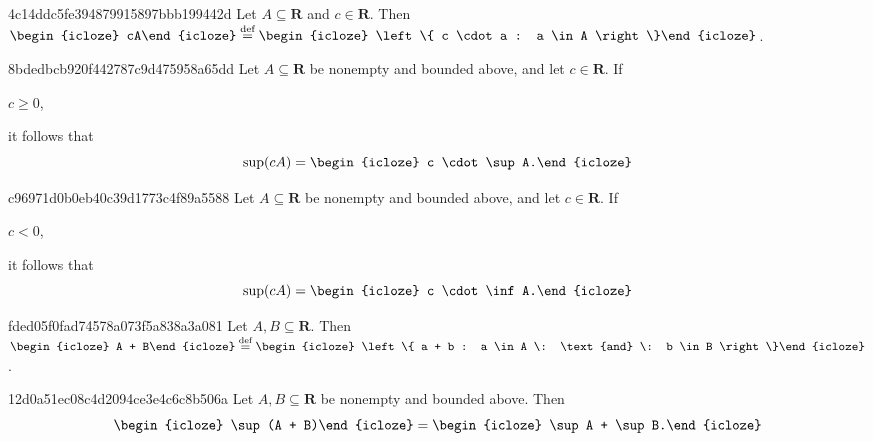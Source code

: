 \begin{note}{4c14ddc5fe394879915897bbb199442d}
    Let \({ A \subseteq \mathbf{R} }\) and \({ c \in \mathbf{R} }\).
    Then \({ \begin{icloze}{2}cA\end{icloze} \overset{\text{def}}= \begin{icloze}{1}\left\{ c \cdot a : a \in A \right\}\end{icloze} }\).
\end{note}

\begin{note}{8bdedbcb920f442787c9d475958a65dd}
    Let \({ A \subseteq \mathbf{R} }\) be nonempty and bounded above, and let \({ c \in \mathbf{R} }\).
    If \begin{icloze}{2}\({ c \geq 0 }\),\end{icloze} it follows that
    \[
        \sup (cA) = \begin{icloze}{1}c \cdot \sup A.\end{icloze}
    \]
\end{note}

\begin{note}{c96971d0b0eb40c39d1773c4f89a5588}
    Let \({ A \subseteq \mathbf{R} }\) be nonempty and bounded above, and let \({ c \in \mathbf{R} }\).
    If \begin{icloze}{2}\({ c < 0 }\),\end{icloze} it follows that
    \[
        \sup (cA) = \begin{icloze}{1}c \cdot \inf A.\end{icloze}
    \]
\end{note}

\begin{note}{fded05f0fad74578a073f5a838a3a081}
    Let \({ A, B \subseteq \mathbf{R} }\).
    Then \({ \begin{icloze}{2}A + B\end{icloze} \overset{\text{def}}= \begin{icloze}{1}\left\{ a + b : a \in A \: \text{and} \: b \in B \right\}\end{icloze} }\).
\end{note}

\begin{note}{12d0a51ec08c4d2094ce3e4c6c8b506a}
    Let \({ A, B \subseteq \mathbf{R} }\) be nonempty and bounded above.
    Then
    \[
        \begin{icloze}{2}\sup (A + B)\end{icloze} = \begin{icloze}{1}\sup A + \sup B.\end{icloze}
    \]
\end{note}

